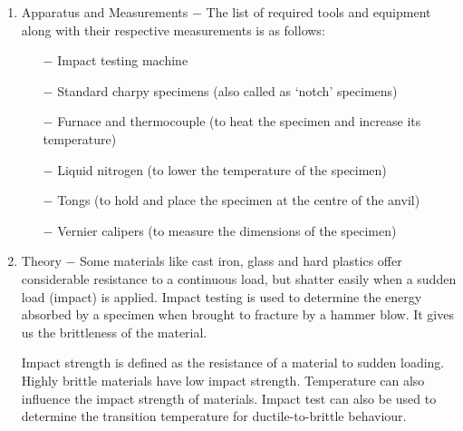 \documentclass[a4paper, 11pt]{article}
\begin{document}
\begin{enumerate}[label=(\alph*)]
	\item { Apparatus and Measurements} $-$ The list of required tools and equipment along with their respective measurements is as follows:
\vspace{-2mm}

	\begin{itemize}
		\item[$-$] Impact testing machine 
		\item[$-$] Standard charpy specimens (also called as `notch' specimens)
		\item[$-$] Furnace and thermocouple (to heat the specimen and increase its temperature)
		\item[$-$] Liquid nitrogen (to lower the temperature of the specimen)
		\item[$-$] Tongs (to hold and place the specimen at the centre of the anvil)
		\item[$-$] Vernier calipers (to measure the dimensions of the specimen)
	\end{itemize}
	
	\item {Theory} $-$ Some materials like cast iron, glass and hard plastics offer considerable resistance to a continuous load, but shatter easily when a sudden load (impact) is applied. Impact testing is used to determine the energy absorbed by a specimen when brought to fracture by a hammer blow. It gives us the brittleness of the material. 

Impact strength is defined as the resistance of a material to sudden loading. Highly brittle materials have low impact strength. Temperature can also influence the impact strength of materials. Impact test can also be used to determine the transition temperature for ductile-to-brittle behaviour.


\end{enumerate}
\end{document}
